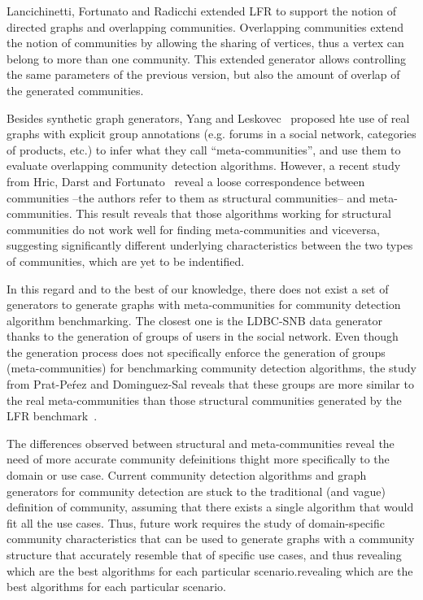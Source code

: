 Lancichinetti, Fortunato and Radicchi \cite{PhysRevE.80.016118} extended LFR to support the notion of directed graphs and overlapping communities. Overlapping communities extend the notion of communities by allowing the sharing of vertices, thus a vertex can belong to more than one community. This extended generator allows controlling the same parameters of the previous version, but also the amount of overlap of the generated communities.

Besides synthetic graph generators, Yang and Leskovec~\cite{yang2015defining} proposed hte use of real graphs with explicit group annotations (e.g. forums in a social network, categories of products, etc.) to infer what they call ``meta-communities'', and use them to evaluate overlapping community detection algorithms. However, a recent study from Hric, Darst and Fortunato~\cite{hric2014community} reveal a loose correspondence between  communities --the authors refer to them as structural communities-- and meta-communities.  This result reveals that those algorithms working for structural communities do not work well for finding meta-communities and viceversa, suggesting significantly different underlying characteristics between the two types of communities, which are yet to be indentified. 

In this regard and to the best of our knowledge, there does not exist a set of generators to generate graphs with meta-communities for community detection algorithm benchmarking. The closest one is the LDBC-SNB data generator~\cite{Erling:2015:LSN:2723372.2742786} thanks to the generation of groups of users in the social network. Even though the generation process does not specifically enforce the generation of groups (meta-communities) for benchmarking community detection algorithms, the study from Prat-Pe\'rez and Dominguez-Sal reveals that these groups are more similar to the real meta-communities than those structural communities generated by the LFR benchmark~\cite{Prat-Perez:2014:CSS:2621934.2621942}. 

The differences observed between structural and meta-communities reveal the need of more accurate community defeinitions thight more specifically to the domain or use case. Current community detection algorithms and graph generators for community detection are stuck to the traditional (and vague) definition of community, assuming that there exists a single algorithm that would fit all the use cases. Thus, future work requires the study of domain-specific community characteristics that can be used to generate graphs with a community structure that accurately resemble that of specific use cases, and thus revealing which are the best algorithms for each particular scenario.revealing which are the best algorithms for each particular scenario.

